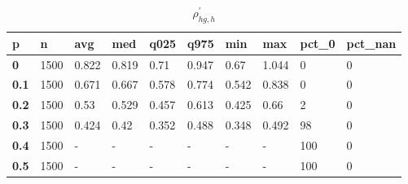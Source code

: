\begin{table}[h]
 \centering 
\footnotesize
\caption{$\rho_{hg,h}^\prime $}
\label{tab:alphahgh}
\begin{tabular}[h]{|l|l|l|l|l|l|l|l|l|l|
    } \hline
\textbf{ p} & \textbf{ n} & \textbf{ avg} & \textbf{ med} & \textbf{ q025} & \textbf{ q975} & \textbf{ min} & \textbf{ max} & \textbf{ pct\_0} & \textbf{ pct\_nan}
    \\ \hline
  \textbf{  0} & 1500 & 0.822 & 0.819 &  0.71 & 0.947 &  0.67 & 1.044 &   0 & 0
    \\ \hline
  \textbf{0.1} & 1500 & 0.671 & 0.667 & 0.578 & 0.774 & 0.542 & 0.838 &   0 & 0
    \\ \hline
  \textbf{0.2} & 1500 &  0.53 & 0.529 & 0.457 & 0.613 & 0.425 &  0.66 &   2 & 0
    \\ \hline
  \textbf{0.3} & 1500 & 0.424 &  0.42 & 0.352 & 0.488 & 0.348 & 0.492 &  98 & 0
    \\ \hline
  \textbf{0.4} & 1500 & - & - & - & - & - & - & 100 & 0
    \\ \hline
  \textbf{0.5} & 1500 & - & - & - & - & - & - & 100 & 0
    \\ \hline
 \end{tabular}
 \end{table}
